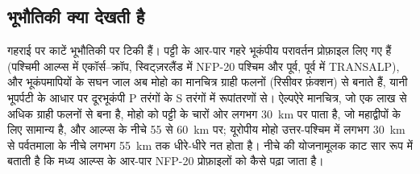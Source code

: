\subsection*{भूभौतिकी क्या देखती है}

गहराई पर काटें भूभौतिकी पर टिकी हैं। पट्टी के आर-पार गहरे भूकंपीय परावर्तन प्रोफ़ाइल
लिए गए हैं (पश्चिमी आल्प्स में एकॉर्स--क्रॉप, स्विट्ज़रलैंड में NFP-20 पश्चिम और पूर्व,
पूर्व में TRANSALP), और भूकंपमापियों के सघन जाल अब मोहो का मानचित्र
ग्राही फलनों (रिसीवर फ़ंक्शन) से बनाते हैं, यानी भूपर्पटी के आधार पर दूरभूकंपी P तरंगों के S तरंगों में रूपांतरणों से।
ऐल्पऐरे मानचित्र, जो एक लाख से अधिक ग्राही फलनों से बना है,
मोहो को पट्टी के चारों ओर लगभग \qty{30}{km} पर पाता है, जो महाद्वीपों के लिए सामान्य है, और आल्प्स के नीचे 55 से
\qty{60}{km} पर; यूरोपीय मोहो उत्तर-पश्चिम में लगभग \qty{30}{km} से पर्वतमाला के नीचे लगभग
\qty{55}{km} तक धीरे-धीरे नत होता है।
नीचे की योजनामूलक काट सार रूप में बताती है कि मध्य आल्प्स के आर-पार NFP-20 प्रोफ़ाइलों को कैसे
पढ़ा जाता है।

